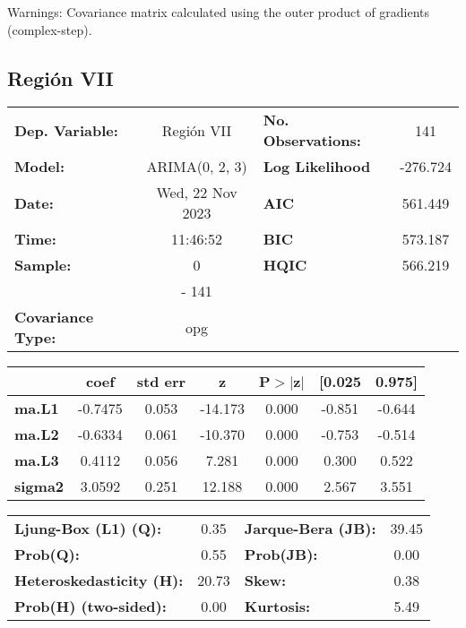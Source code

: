 \documentclass{article}%
\begin{document}
Warnings: \newline
 [1] Covariance matrix calculated using the outer product of gradients (complex-step).%
\subsection*{Región VII}%
\begin{center}
\begin{tabular}{lclc}
\toprule
\textbf{Dep. Variable:}          &    Región VII    & \textbf{  No. Observations:  } &    141      \\
\textbf{Model:}                  &  ARIMA(0, 2, 3)  & \textbf{  Log Likelihood     } &  -276.724   \\
\textbf{Date:}                   & Wed, 22 Nov 2023 & \textbf{  AIC                } &  561.449    \\
\textbf{Time:}                   &     11:46:52     & \textbf{  BIC                } &  573.187    \\
\textbf{Sample:}                 &        0         & \textbf{  HQIC               } &  566.219    \\
\textbf{}                        &       - 141      & \textbf{                     } &             \\
\textbf{Covariance Type:}        &       opg        & \textbf{                     } &             \\
\bottomrule
\end{tabular}
\begin{tabular}{lcccccc}
                & \textbf{coef} & \textbf{std err} & \textbf{z} & \textbf{P$> |$z$|$} & \textbf{[0.025} & \textbf{0.975]}  \\
\midrule
\textbf{ma.L1}  &      -0.7475  &        0.053     &   -14.173  &         0.000        &       -0.851    &       -0.644     \\
\textbf{ma.L2}  &      -0.6334  &        0.061     &   -10.370  &         0.000        &       -0.753    &       -0.514     \\
\textbf{ma.L3}  &       0.4112  &        0.056     &     7.281  &         0.000        &        0.300    &        0.522     \\
\textbf{sigma2} &       3.0592  &        0.251     &    12.188  &         0.000        &        2.567    &        3.551     \\
\bottomrule
\end{tabular}
\begin{tabular}{lclc}
\textbf{Ljung-Box (L1) (Q):}     &  0.35 & \textbf{  Jarque-Bera (JB):  } & 39.45  \\
\textbf{Prob(Q):}                &  0.55 & \textbf{  Prob(JB):          } &  0.00  \\
\textbf{Heteroskedasticity (H):} & 20.73 & \textbf{  Skew:              } &  0.38  \\
\textbf{Prob(H) (two-sided):}    &  0.00 & \textbf{  Kurtosis:          } &  5.49  \\
\bottomrule
\end{tabular}
\end{center}
\end{document}
